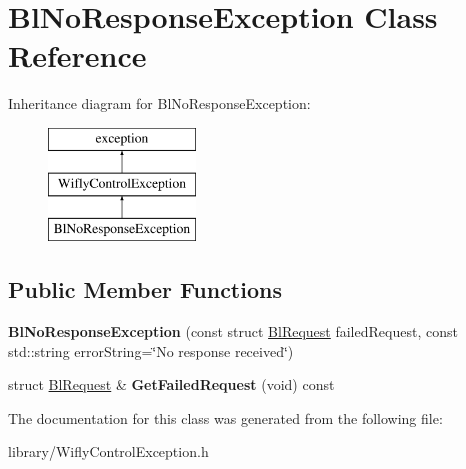 \hypertarget{class_bl_no_response_exception}{\section{Bl\-No\-Response\-Exception Class Reference}
\label{class_bl_no_response_exception}
}
Inheritance diagram for Bl\-No\-Response\-Exception\-:\begin{figure}[H]
\begin{center}
\leavevmode
\includegraphics[height=3.000000cm]{class_bl_no_response_exception}
\end{center}
\end{figure}
\subsection*{Public Member Functions}
\begin{DoxyCompactItemize}
\item 
\hypertarget{class_bl_no_response_exception_ae3e31d1bd98466bcb7af228d1195da2c}{{\bfseries Bl\-No\-Response\-Exception} (const struct \hyperlink{struct_bl_request}{Bl\-Request} failed\-Request, const std\-::string error\-String=\char`\"{}No response received\char`\"{})}\label{class_bl_no_response_exception_ae3e31d1bd98466bcb7af228d1195da2c}

\item 
\hypertarget{class_bl_no_response_exception_aa8c6c0a7ac0e88cda1f6b04932373f5d}{struct \hyperlink{struct_bl_request}{Bl\-Request} \& {\bfseries Get\-Failed\-Request} (void) const }\label{class_bl_no_response_exception_aa8c6c0a7ac0e88cda1f6b04932373f5d}

\end{DoxyCompactItemize}


The documentation for this class was generated from the following file\-:\begin{DoxyCompactItemize}
\item 
library/Wifly\-Control\-Exception.\-h\end{DoxyCompactItemize}
